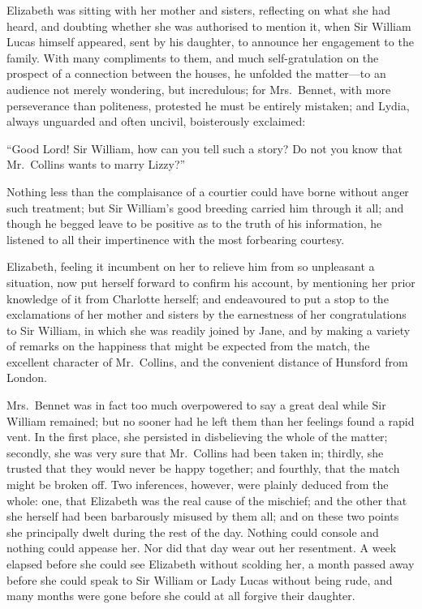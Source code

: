\documentclass[12pt,english,oneside]{book}
\begin{document}


Elizabeth was sitting with her mother and sisters, reflecting on what
she had heard, and doubting whether she was authorised to mention
it, when Sir William Lucas himself appeared, sent by his daughter,
to announce her engagement to the family. With many compliments to
them, and much self-gratulation on the prospect of a connection between
the houses, he unfolded the matter\mbox{---}to an audience not merely
wondering, but incredulous; for Mrs.\ Bennet, with more perseverance
than politeness, protested he must be entirely mistaken; and Lydia,
always unguarded and often uncivil, boisterously exclaimed:

{}``Good Lord! Sir William, how can you tell such a story? Do not
you know that Mr.\ Collins wants to marry Lizzy?''\ 

Nothing less than the complaisance of a courtier could have borne
without anger such treatment; but Sir William's good breeding carried
him through it all; and though he begged leave to be positive as to
the truth of his information, he listened to all their impertinence
with the most forbearing courtesy.

Elizabeth, feeling it incumbent on her to relieve him from so unpleasant
a situation, now put herself forward to confirm his account, by mentioning
her prior knowledge of it from Charlotte herself; and endeavoured
to put a stop to the exclamations of her mother and sisters by the
earnestness of her congratulations to Sir William, in which she was
readily joined by Jane, and by making a variety of remarks on the
happiness that might be expected from the match, the excellent character
of Mr.\ Collins, and the convenient distance of Hunsford from London.

Mrs.\ Bennet was in fact too much overpowered to say a great deal
while Sir William remained; but no sooner had he left them than her
feelings found a rapid vent. In the first place, she persisted in
disbelieving the whole of the matter; secondly, she was very sure
that Mr.\ Collins had been taken in; thirdly, she trusted that they
would never be happy together; and fourthly, that the match might
be broken off. Two inferences, however, were plainly deduced from
the whole: one, that Elizabeth was the real cause of the mischief;
and the other that she herself had been barbarously misused by them
all; and on these two points she principally dwelt during the rest
of the day. Nothing could console and nothing could appease her. Nor
did that day wear out her resentment. A week elapsed before she could
see Elizabeth without scolding her, a month passed away before she
could speak to Sir William or Lady Lucas without being rude, and many
months were gone before she could at all forgive their daughter.
\end{document}
